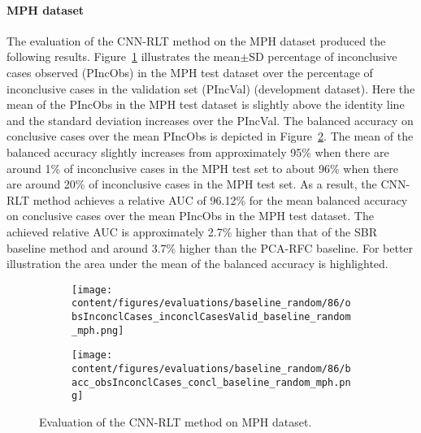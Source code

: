 \paragraph{MPH dataset}

The evaluation of the CNN-RLT method on the MPH dataset produced the following results.
Figure~\ref{fig:obsInconclCases_inconclCasesValid_baseline_random_mph} illustrates
the mean$\pm$SD percentage of inconclusive cases observed (PIncObs) in the MPH test dataset 
over the percentage of inconclusive cases in the validation set (PIncVal) (development dataset).
Here the mean of the PIncObs in the MPH test dataset is slightly above the identity line 
and the standard deviation increases over the PIncVal.
The balanced accuracy on conclusive cases over the mean PIncObs is depicted 
in Figure~\ref{fig:bacc_obsInconclCases_concl_baseline_random_mph}.
The mean of the balanced accuracy slightly increases from approximately 95\% 
when there are around 1\% of inconclusive cases in the MPH test set to about 96\% 
when there are around 20\% of inconclusive cases in the MPH test set.
As a result, the CNN-RLT method achieves a relative AUC of 96.12\% for the mean balanced accuracy on conclusive cases 
over the mean PIncObs in the MPH test dataset.
The achieved relative AUC is approximately 2.7\% higher than that of the SBR baseline method 
and around 3.7\% higher than the PCA-RFC baseline.
For better illustration the area under the mean of the balanced accuracy is highlighted.


\begin{figure}[ht]
  \begin{subfigure}{0.9\textwidth}
    \centering
    \texttt{[image: content/figures/evaluations/baseline\_random/86/obsInconclCases\_inconclCasesValid\_baseline\_random\_mph.png]}
    \label{fig:obsInconclCases_inconclCasesValid_baseline_random_mph}
  \end{subfigure}
  \hfill
  \begin{subfigure}{0.9\textwidth}
    \centering
    \texttt{[image: content/figures/evaluations/baseline\_random/86/bacc\_obsInconclCases\_concl\_baseline\_random\_mph.png]}
    \label{fig:bacc_obsInconclCases_concl_baseline_random_mph}
  \end{subfigure}
  \caption{Evaluation of the CNN-RLT method on MPH dataset.}
  \label{fig:perf_eval_rlt_mph}
\end{figure}


